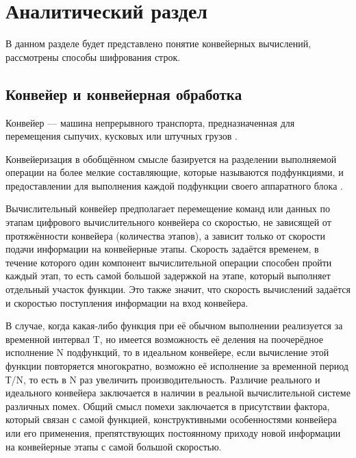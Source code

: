\chapter{Аналитический раздел}
\label{cha:analysis}
В данном разделе будет представлено понятие конвейерных вычислений, рассмотрены способы шифрования строк.

\section{Конвейер и конвейерная обработка}
Конвейер — машина непрерывного транспорта, предназначенная для перемещения сыпучих, кусковых или штучных грузов \cite{conveyorbelt}.
\par Конвейеризация в обобщённом смысле базируется на разделении выполняемой операции на более мелкие составляющие, которые называются подфункциями, и предоставлении для выполнения каждой подфункции своего аппаратного блока \cite{conveyor}.

\par Вычислительный конвейер предполагает перемещение команд или данных по этапам цифрового вычислительного конвейера со скоростью, не зависящей от протяжённости конвейера (количества этапов), а зависит только от скорости подачи информации на конвейерные этапы. Скорость задаётся временем, в течение которого один компонент вычислительной операции способен пройти каждый этап, то есть самой большой задержкой на этапе, который выполняет отдельный участок функции. Это также значит, что скорость вычислений задаётся и скоростью поступления информации на вход конвейера. 
\par В случае, когда какая-либо функция при её обычном выполнении реализуется за временной интервал T, но имеется возможность её деления на поочерёдное исполнение N подфункций, то в идеальном конвейере, если вычисление этой функции повторяется многократно, возможно её исполнение за временной период Т/N, то есть в N раз увеличить производительность. Различие реального и идеального конвейера заключается в наличии в реальной вычислительной системе различных помех. Общий смысл помехи заключается в присутствии фактора, который связан с самой функцией, конструктивными особенностями конвейера или его применения, препятствующих постоянному приходу новой информации на конвейерные этапы с самой большой скоростью.

